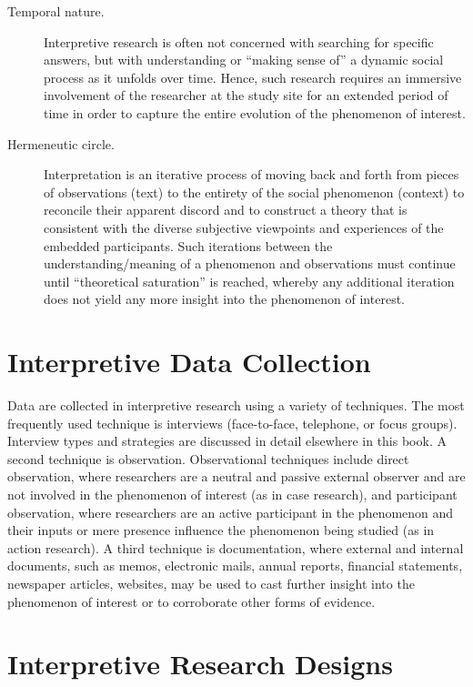 \begin{description}
	\item[Temporal nature.] Interpretive research is often not concerned with searching for specific answers, but with understanding or ``making sense of'' a dynamic social process as it unfolds over time. Hence, such research requires an immersive involvement of the researcher at the study site for an extended period of time in order to capture the entire evolution of the phenomenon of interest.

	\item[Hermeneutic circle.] Interpretation is an iterative process of moving back and forth from pieces of observations (text) to the entirety of the social phenomenon (context) to reconcile their apparent discord and to construct a theory that is consistent with the diverse subjective viewpoints and experiences of the embedded participants. Such iterations between the understanding/meaning of a phenomenon and observations must continue until ``theoretical saturation'' is reached, whereby any additional iteration does not yield any more insight into the phenomenon of interest.

\end{description}

\section{Interpretive Data Collection}

Data are collected in interpretive research using a variety of techniques. The most frequently used technique is interviews (face-to-face, telephone, or focus groups). Interview types and strategies are discussed in detail elsewhere in this book. A second technique is observation. Observational techniques include direct observation, where researchers are a neutral and passive external observer and are not involved in the phenomenon of interest (as in case research), and participant observation, where researchers are an active participant in the phenomenon and their inputs or mere presence influence the phenomenon being studied (as in action research). A third technique is documentation, where external and internal documents, such as memos, electronic mails, annual reports, financial statements, newspaper articles, websites, may be used to cast further insight into the phenomenon of interest or to corroborate other forms of evidence.

\section{Interpretive Research Designs}

